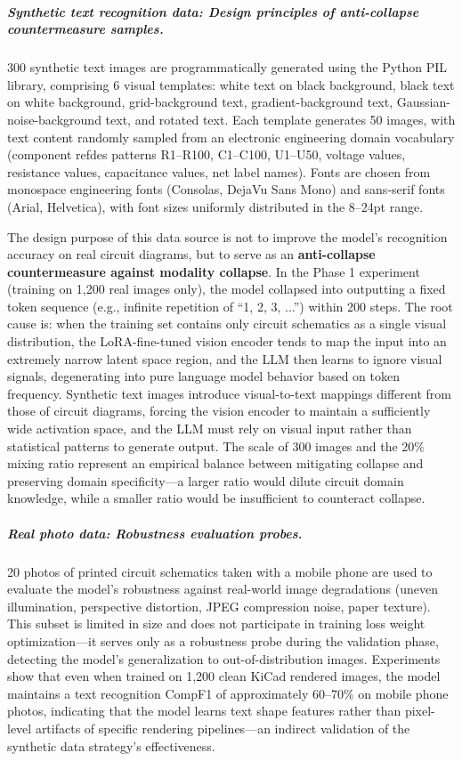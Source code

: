\subparagraph{Synthetic text recognition data: Design principles of anti-collapse countermeasure samples.}
300 synthetic text images are programmatically generated using the Python PIL library, comprising 6 visual templates: white text on black background, black text on white background, grid-background text, gradient-background text, Gaussian-noise-background text, and rotated text. Each template generates 50 images, with text content randomly sampled from an electronic engineering domain vocabulary (component refdes patterns R1--R100, C1--C100, U1--U50, voltage values, resistance values, capacitance values, net label names). Fonts are chosen from monospace engineering fonts (Consolas, DejaVu Sans Mono) and sans-serif fonts (Arial, Helvetica), with font sizes uniformly distributed in the 8--24pt range.

The design purpose of this data source is not to improve the model's recognition accuracy on real circuit diagrams, but to serve as an \textbf{anti-collapse countermeasure against modality collapse}. In the Phase 1 experiment (training on 1,200 real images only), the model collapsed into outputting a fixed token sequence (e.g., infinite repetition of ``1, 2, 3, ...'') within 200 steps. The root cause is: when the training set contains only circuit schematics as a single visual distribution, the LoRA-fine-tuned vision encoder tends to map the input into an extremely narrow latent space region, and the LLM then learns to ignore visual signals, degenerating into pure language model behavior based on token frequency. Synthetic text images introduce visual-to-text mappings different from those of circuit diagrams, forcing the vision encoder to maintain a sufficiently wide activation space, and the LLM must rely on visual input rather than statistical patterns to generate output. The scale of 300 images and the 20\% mixing ratio represent an empirical balance between mitigating collapse and preserving domain specificity---a larger ratio would dilute circuit domain knowledge, while a smaller ratio would be insufficient to counteract collapse.

\subparagraph{Real photo data: Robustness evaluation probes.}
20 photos of printed circuit schematics taken with a mobile phone are used to evaluate the model's robustness against real-world image degradations (uneven illumination, perspective distortion, JPEG compression noise, paper texture). This subset is limited in size and does not participate in training loss weight optimization---it serves only as a robustness probe during the validation phase, detecting the model's generalization to out-of-distribution images. Experiments show that even when trained on 1,200 clean KiCad rendered images, the model maintains a text recognition CompF1 of approximately 60--70\% on mobile phone photos, indicating that the model learns text shape features rather than pixel-level artifacts of specific rendering pipelines---an indirect validation of the synthetic data strategy's effectiveness.


